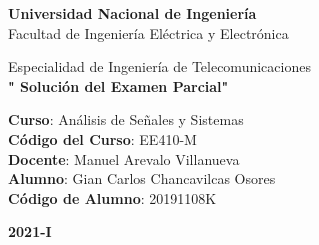 \documentclass[10pt,a4paper]{article}
\begin{document}
\begin{titlepage}%
	\begin{center}
	 {\huge \textbf{Universidad Nacional de Ingeniería}}\\
	 \vspace{3mm}
	  {\Large {Facultad de Ingeniería Eléctrica y Electrónica}}\\
	\vspace{-5mm}	 
	 \begin{figure}[h]
	 	\centering 
	 	 
	 \end{figure}
	 \vspace{-6mm}
	{\Large {Especialidad de Ingeniería de Telecomunicaciones}}\\
	\vspace{3mm}
	{\Large \textbf{" Soluci\'on del Examen Parcial"}}\\
	\vspace{8mm}
	\begin{flushleft}
	{\Large {\textbf{Curso}: Análisis de Señales y Sistemas}}\\
	\vspace{8mm}		
	{\Large {\textbf{Código del Curso}: EE410-M}}\\	
	\vspace{8mm}	
	{\Large {\textbf{Docente}: Manuel Arevalo Villanueva}}\\
	\vspace{8mm}	
	{\Large {\textbf{Alumno}: Gian Carlos Chancavilcas Osores}}\\
	\vspace{8mm}	
	{\Large {\textbf{Código de Alumno}: 20191108K}}\\
	\end{flushleft}
	\vspace{10mm}
	{\Huge {\textbf{2021-I}}}\\
	\end{center}
\end{titlepage}
\end{document}
